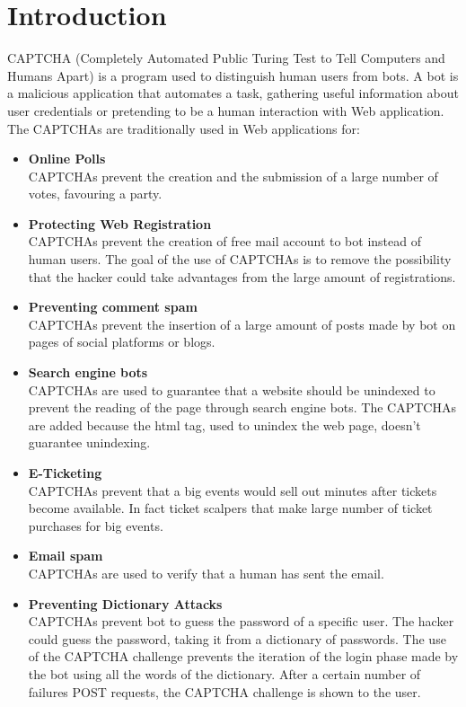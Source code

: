 \chapter{Introduction}
CAPTCHA (Completely Automated Public Turing Test to Tell Computers and Humans Apart) is a program used to distinguish human users from bots. A bot is a malicious application that automates a task, gathering useful information about user credentials or pretending to be a human interaction with Web application.\\
The CAPTCHAs are traditionally used in Web applications for\cite{text_audio}:
\begin{itemize}
\item{\textbf{Online Polls}\\
CAPTCHAs prevent the creation and the submission of a large number of votes, favouring a party.
}
\item{\textbf{Protecting Web Registration}\\
CAPTCHAs prevent the creation of free mail account to bot instead of human users. The goal of the use of CAPTCHAs is to remove the possibility that the hacker could take advantages from the large amount of registrations.
}
\item{\textbf{Preventing comment spam}\\
CAPTCHAs prevent the insertion of a large amount of posts made by bot on pages of social platforms or blogs.
}
\item{\textbf{Search engine bots}\\
CAPTCHAs are used to guarantee that a website should be unindexed to prevent the reading of the page through search engine bots. The CAPTCHAs are added because the html tag, used to unindex the web page, doesn't guarantee unindexing.
}
\item{\textbf{E-Ticketing}\\
CAPTCHAs prevent that a big events would sell out minutes after tickets become available. In fact ticket scalpers that make large number of ticket purchases for big events.
}
\item{\textbf{Email spam}\\
CAPTCHAs are used to verify that a human has sent the email.
}
\item{\textbf{Preventing Dictionary Attacks}\\
CAPTCHAs prevent bot to guess the password of a specific user. The hacker could guess the password, taking it from a dictionary of passwords. The use of the CAPTCHA challenge prevents the iteration of the login phase made by the bot using all the words of the dictionary. After a certain number of failures POST requests, the CAPTCHA challenge is shown to the user.}

\end{itemize}
